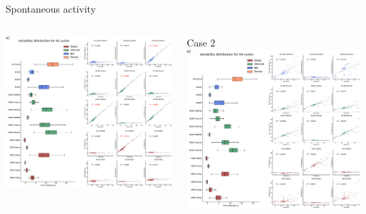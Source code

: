 \documentclass[aspectratio=43]{beamer}
\begin{document}
\begin{frame}{Spontaneous activity}
{\begin{columns}
\begin{column}{0.6\textwidth}
				\includegraphics[width=\textwidth]{invariants/data/SUSSEX/prep2/images/3phases/panel_with_intervals_boxplot_invariants.pdf}
			\end{column}
			\begin{column}{0.6\textwidth}
				\centering Case 2
				\includegraphics[width=\textwidth]{invariants/data/SUSSEX/prep3/images/3phases/panel_with_intervals_boxplot_invariants.pdf}
			\end{column}
		\end{columns}
	}
\end{frame}
\end{document}
